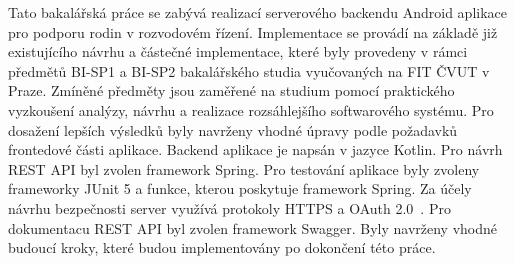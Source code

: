 %
%
Tato bakalářská práce se zabývá realizací serverového backendu Android aplikace pro podporu rodin v rozvodovém řízení. Implementace se provádí na základě již existujícího návrhu a částečné implementace, které byly provedeny v rámci předmětů BI-SP1 a BI-SP2 bakalářského studia vyučovaných na FIT ČVUT v Praze. Zmíněné předměty jsou zaměřené na studium pomocí praktického vyzkoušení analýzy, návrhu a realizace rozsáhlejšího softwarového systému. Pro dosažení lepších výsledků byly navrženy vhodné úpravy podle požadavků frontedové části aplikace. Backend aplikace je napsán v jazyce Kotlin. Pro návrh REST API byl zvolen framework Spring. Pro testování aplikace byly zvoleny frameworky JUnit 5 a funkce, kterou poskytuje framework Spring. Za účely návrhu bezpečnosti server využívá protokoly HTTPS a OAuth 2.0~. Pro dokumentacu REST API byl zvolen framework Swagger. Byly navrženy vhodné budoucí kroky, které budou implementovány po dokončení této práce.